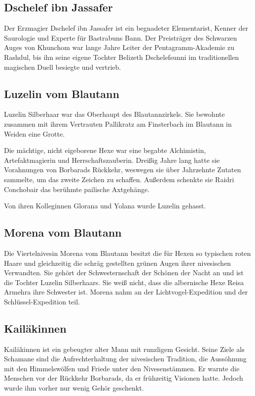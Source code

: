 \subsection{Dschelef ibn Jassafer}
Der Erzmagier Dschelef ibn Jassafer ist ein begnadeter Elementarist, Kenner der Saurologie und Experte für Bastrabuns Bann. Der Preisträger des Schwarzen Auges von Khunchom war lange Jahre Leiter der Pentagramm-Akademie zu Rashdul, bis ihn seine eigene Tochter Belizeth Dschelefsunni im traditionellen magischen Duell besiegte und vertrieb. 

\subsection{Luzelin vom Blautann}
Luzelin Silberhaar war das Oberhaupt des Blautannzirkels. Sie bewohnte zusammen mit ihrem Vertrauten Pallikratz am Finsterbach im Blautann in Weiden eine Grotte.

Die mächtige, nicht eigeborene Hexe war eine begabte Alchimistin, Artefaktmagierin und Herrschaftszauberin. Dreißig Jahre lang hatte sie Vorahnungen von Borbarads Rückkehr, weswegen sie über Jahrzehnte Zutaten sammelte, um das zweite Zeichen zu schaffen. Außerdem schenkte sie Raidri Conchobair das berühmte pailische Axtgehänge.

Von ihren Kolleginnen Glorana und Yolana wurde Luzelin gehasst. 

\subsection{Morena vom Blautann}
Die Viertelnivesin Morena vom Blautann besitzt die für Hexen so typischen roten Haare und gleichzeitig die schräg gestellten grünen Augen ihrer nivesischen Verwandten. Sie gehört der Schwesternschaft der Schönen der Nacht an und ist die Tochter Luzelin Silberhaars. Sie weiß nicht, dass die albernische Hexe Reisa Armehra ihre Schwester ist. Morena nahm an der Lichtvogel-Expedition und der Schlüssel-Expedition teil. 

\subsection{Kailäkinnen}
Kailäkinnen ist ein gebeugter alter Mann mit runzligem Gesicht. Seine Ziele als Schamane sind die Aufrechterhaltung der nivesischen Tradition, die Aussöhnung mit den Himmelswölfen und Friede unter den Nivesenstämmen.
Er warnte die Menschen vor der Rückkehr Borbarads, da er frühzeitig Visionen hatte. Jedoch wurde ihm vorher nur wenig Gehör geschenkt.

